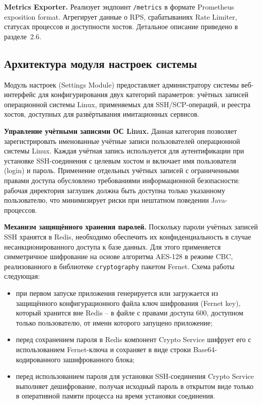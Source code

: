 \textbf{Metrics Exporter.} Реализует эндпоинт \texttt{/metrics} в формате Prometheus exposition format. Агрегирует данные о RPS, срабатываниях Rate Limiter, статусах процессов и доступности хостов. Детальное описание приведено в разделе~2.6.

\subsection{Архитектура модуля настроек системы}

Модуль настроек (Settings Module) предоставляет администратору системы веб-интерфейс для конфигурирования двух категорий параметров: учётных записей операционной системы Linux, применяемых для SSH/SCP-операций, и реестра хостов, доступных для развёртывания имитационных сервисов.

\textbf{Управление учётными записями ОС Linux.} Данная категория позволяет зарегистрировать именованные учётные записи пользователей операционной системы Linux. Каждая учётная запись используется для аутентификации при установке SSH-соединения с целевым хостом и включает имя пользователя (login) и пароль. Применение отдельных учётных записей с ограниченными правами доступа обусловлено требованиями информационной безопасности: рабочая директория заглушек должна быть доступна только указанному пользователю, что минимизирует риски при нештатном поведении Java-процессов.

\textbf{Механизм защищённого хранения паролей.} Поскольку пароли учётных записей SSH хранятся в Redis, необходимо обеспечить их конфиденциальность в случае несанкционированного доступа к базе данных. Для этого применяется симметричное шифрование на основе алгоритма AES-128 в режиме CBC, реализованного в библиотеке \texttt{cryptography} пакетом Fernet. Схема работы следующая:

\begin{itemize}
\item при первом запуске приложения генерируется или загружается из защищённого конфигурационного файла ключ шифрования (Fernet key), который хранится вне Redis -- в файле с правами доступа 600, доступном только пользователю, от имени которого запущено приложение;
\item перед сохранением пароля в Redis компонент Crypto Service шифрует его с использованием Fernet-ключа и сохраняет в виде строки Base64-кодированного зашифрованного блока;
\item перед использованием пароля для установки SSH-соединения Crypto Service выполняет дешифрование, получая исходный пароль в открытом виде только в оперативной памяти процесса на время установки соединения.
\end{itemize}

